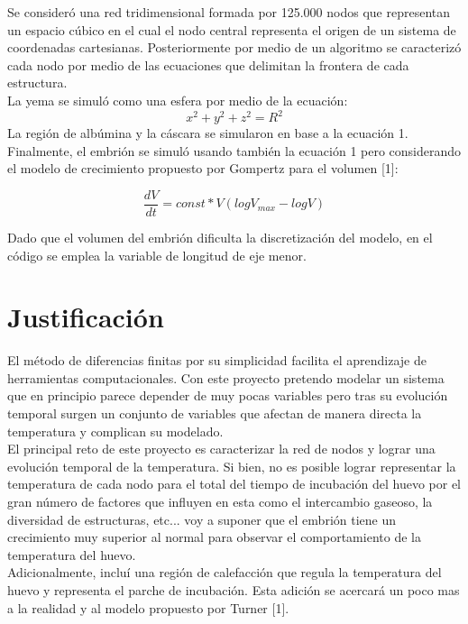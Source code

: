 \documentclass{article}
\begin{document}
	Se consideró una red tridimensional formada por 125.000 nodos que representan un espacio cúbico en el cual el nodo central representa el origen de un sistema de coordenadas cartesianas. Posteriormente por medio de un algoritmo se caracterizó cada nodo por medio de las ecuaciones que delimitan la frontera de cada estructura.\\ 
	
	La yema se simuló como una esfera por medio de la ecuación:
	\begin{equation}
		x^2 + y^2 + z^2 = R^2
	\end{equation}
	La región de albúmina y la cáscara se simularon en base a la ecuación 1. Finalmente, el embrión se simuló usando también la ecuación 1 pero considerando el modelo de crecimiento propuesto por Gompertz para el volumen [1]: 
	 
	\begin{equation}
		\frac{dV}{dt}= const * V (log V_{max}-log V)
	\end{equation}
	
	Dado que el volumen del embrión dificulta la discretización del modelo, en el código se emplea la variable de longitud de eje menor.
	
	\section{Justificación}
	El método de diferencias finitas por su simplicidad facilita el aprendizaje de herramientas computacionales. Con este proyecto pretendo modelar un sistema que en principio parece depender de muy pocas variables pero tras su evolución temporal surgen un conjunto de variables que afectan de manera directa la temperatura y complican su modelado.\\
	
	El principal reto de este proyecto es caracterizar la red de nodos y lograr una evolución temporal de la temperatura. Si bien, no es posible lograr representar la temperatura de cada nodo para el total del tiempo de incubación del huevo por el gran número de factores que influyen en esta como el intercambio gaseoso, la diversidad de estructuras, etc... voy a suponer que el embrión tiene un crecimiento muy superior al normal para observar el comportamiento de la temperatura del huevo. \\
	
	Adicionalmente, incluí una región de calefacción que regula la temperatura del huevo y representa el parche de incubación. Esta adición se acercará un poco mas a la realidad y al modelo propuesto por Turner [1].
	
\end{document}
